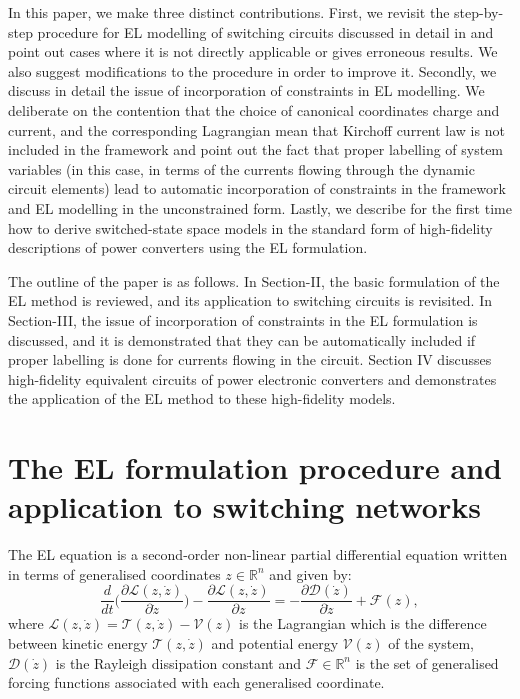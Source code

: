 \documentclass[preprint,12pt]{elsarticle}
\begin{document}

In this paper, we make three distinct contributions. First, we revisit the step-by-step procedure for EL modelling of switching circuits discussed in detail in \cite{scherpen_2003, umetani2016, scherpen_99, yildiz2009} and point out cases where it is not directly applicable or gives erroneous results. We also suggest modifications to the procedure in order to improve it. Secondly, we discuss in detail the issue of incorporation of constraints in EL modelling. We deliberate on the contention \citep{scherpen_2003} that the choice of canonical coordinates charge and current, and the corresponding Lagrangian mean that Kirchoff current law is not included in the framework and point out the fact that proper labelling of system variables (in this case, in terms of the currents flowing through the dynamic circuit elements) lead to automatic incorporation of constraints in the framework and EL modelling in the unconstrained form. Lastly, we describe for the first time how to derive switched-state space models in the standard form of high-fidelity descriptions of power converters using the EL formulation.

The outline of the paper is as follows. In Section-II, the basic formulation of the EL method is reviewed, and its application to switching circuits is revisited. In Section-III, the issue of incorporation of constraints in the EL formulation is discussed, and it is demonstrated that they can be automatically included if proper labelling is done for currents flowing in the circuit. Section IV discusses high-fidelity equivalent circuits of power electronic converters and demonstrates the application of the EL method to these high-fidelity models.
\section{The EL formulation procedure and application to switching networks}
\label{inad}
The EL equation is a second-order non-linear partial differential equation written in terms of generalised coordinates $z \in \mathbb{R}^n$ and given by:
\begin{equation} \label{Eq1}
\frac{d}{d t} \Biggl(\frac{\partial \mathcal{L}(z,\dot{z})}{\partial \dot{z}}\Biggr)-\frac{ \partial \mathcal{L}(z,\dot{z})}{\partial z}=-\frac{ \partial \mathcal{D}(\dot{z})}{\partial \dot{z}}+\mathcal{F}(z),
\end{equation}
where $\mathcal{L}(z,\dot{z})=\mathcal{T}(z,\dot{z})-\mathcal{V}(z)$ is the Lagrangian which is the difference between kinetic energy $\mathcal{T}(z,\dot{z})$ and potential energy $\mathcal{V}(z)$ of the system, $\mathcal{D}(\dot{z})$ is the Rayleigh dissipation constant and $\mathcal{F} \in \mathbb{R}^n$ is the set of generalised forcing functions associated with each generalised coordinate.
\end{document}

